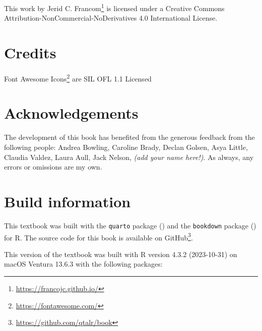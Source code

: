 \documentclass[
  letterpaper,
  DIV=11,
  numbers=noendperiod]{scrreprt}
\theoremstyle{definition}
\theoremstyle{remark}
\DeclareRobustCommand{\href}[2]{#2\footnote{\url{#1}}}
\begin{document}

This work by \href{https://francojc.github.io/}{Jerid C. Francom} is
licensed under a Creative Commons
Attribution-NonCommercial-NoDerivatives 4.0 International License.

\section*{Credits}\label{credits}


\href{https://fontawesome.com/}{Font Awesome Icons} are SIL OFL 1.1
Licensed

\section*{Acknowledgements}\label{acknowledgements}


The development of this book has benefited from the generous feedback
from the following people: Andrea Bowling, Caroline Brady, Declan
Golsen, Asya Little, Claudia Valdez, Laura Aull, Jack Nelson, \emph{(add
your name here!)}. As always, any errors or omissions are my own.

\section*{Build information}\label{build-information}


This textbook was built with the \texttt{quarto} package
() and the \texttt{bookdown}
package () for R. The source code
for this book is available on
\href{https://github.com/qtalr/book}{GitHub}.

This version of the textbook was built with R version 4.3.2 (2023-10-31)
on macOS Ventura 13.6.3 with the following packages:
\end{document}

